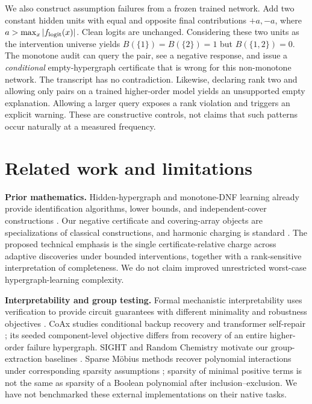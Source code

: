 \documentclass[10pt]{article}
\theoremstyle{definition}\newtheorem{definition}[theorem]{Definition}
\begin{document}
We also construct assumption failures from a frozen trained network. Add two constant
hidden units with equal and opposite final contributions $+a,-a$, where
$a>\max_x|f_{\rm logit}(x)|$. Clean logits are unchanged. Considering these two units
as the intervention universe yields $B(\{1\})=B(\{2\})=1$ but $B(\{1,2\})=0$.
The monotone audit can query the pair, see a negative response, and issue a
\emph{conditional} empty-hypergraph certificate that is wrong for this non-monotone
network. The transcript has no contradiction. Likewise, declaring rank two and
allowing only pairs on a trained higher-order model yields an unsupported empty
explanation. Allowing a larger query exposes a rank violation and triggers an
explicit warning. These are constructive controls, not claims that such patterns
occur naturally at a measured frequency.

\section{Related work and limitations}
\textbf{Prior mathematics.} Hidden-hypergraph and monotone-DNF learning already
provide identification algorithms, lower bounds, and independent-cover constructions
\citep{angluin2006,abasi2014,chen2026}. Our negative certificate and covering-array
objects are specializations of classical constructions, and harmonic charging is
standard \citep{chvatal1979,colbourn2004}. The proposed technical emphasis is the
single certificate-relative charge across adaptive discoveries under bounded
interventions, together with a rank-sensitive interpretation of completeness.
We do not claim improved unrestricted worst-case hypergraph-learning complexity.

\textbf{Interpretability and group testing.} Formal mechanistic interpretability
uses verification to provide circuit guarantees with different minimality and
robustness objectives \citep{hadad2026}. CoAx studies conditional backup recovery
and transformer self-repair \citep{gong2026}; its seeded component-level objective
differs from recovery of an entire higher-order failure hypergraph. SIGHT and Random
Chemistry motivate our group-extraction baselines \citep{clarfeld2019}. Sparse
M\"obius methods recover polynomial interactions under corresponding sparsity
assumptions \citep{kang2024}; sparsity of minimal positive terms is not the same as
sparsity of a Boolean polynomial after inclusion--exclusion. We have not benchmarked
these external implementations on their native tasks.
\end{document}
